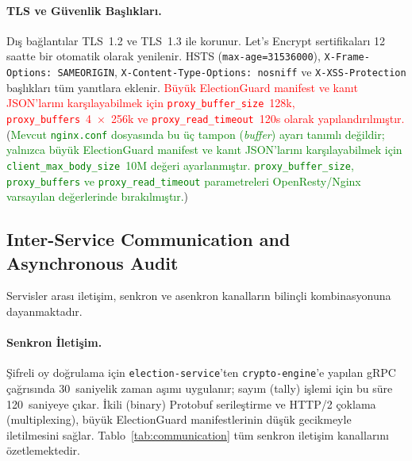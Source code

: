 \documentclass[a4paper,fleqn]{cas-sc}
\begin{document}
\paragraph{TLS ve Güvenlik Başlıkları.}
Dış bağlantılar TLS~1.2 ve TLS~1.3 ile korunur.
Let's Encrypt sertifikaları 12 saatte bir otomatik olarak yenilenir.
HSTS (\texttt{max-age=31536000}), \texttt{X-Frame-Options: SAMEORIGIN},
\texttt{X-Content-Type-Options: nosniff} ve \texttt{X-XSS-Protection}
başlıkları tüm yanıtlara eklenir.
\textcolor{red}{Büyük ElectionGuard manifest ve kanıt JSON'larını karşılayabilmek için
\texttt{proxy\_buffer\_size}~128k, \texttt{proxy\_buffers}~4~×~256k ve
\texttt{proxy\_read\_timeout}~120s olarak yapılandırılmıştır.}
(\textcolor{green}{Mevcut \texttt{nginx.conf} dosyasında bu üç tampon (\textit{buffer}) ayarı tanımlı değildir; yalnızca büyük ElectionGuard manifest ve kanıt JSON'larını karşılayabilmek için \texttt{client\_max\_body\_size}~10M değeri ayarlanmıştır. \texttt{proxy\_buffer\_size}, \texttt{proxy\_buffers} ve \texttt{proxy\_read\_timeout} parametreleri OpenResty/Nginx varsayılan değerlerinde bırakılmıştır.})

\subsection{Inter-Service Communication and Asynchronous Audit}
\label{subsec:interservice}

Servisler arası iletişim, senkron ve asenkron kanalların bilinçli
kombinasyonuna dayanmaktadır.

\paragraph{Senkron İletişim.}
Şifreli oy doğrulama için \texttt{election-service}'ten
\texttt{crypto-engine}'e yapılan gRPC çağrısında 30~saniyelik zaman aşımı
uygulanır; sayım (tally) işlemi için bu süre 120~saniyeye çıkar.
İkili (binary) Protobuf serileştirme ve HTTP/2 çoklama (multiplexing),
büyük ElectionGuard manifestlerinin düşük gecikmeyle iletilmesini sağlar.
Tablo~\ref{tab:communication} tüm senkron iletişim kanallarını özetlemektedir.
\end{document}
